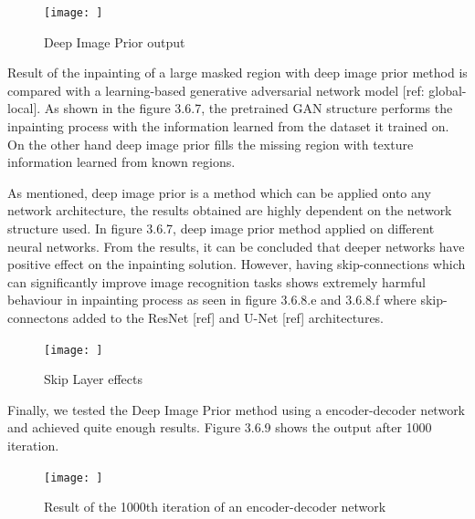 \begin{figure}[h]
    \centering
    \texttt{[image: ]}
    \caption{Deep Image Prior output}
    \label{fig:my_label}
\end{figure}

Result of the inpainting of a large masked region with deep image prior method is compared with a learning-based generative adversarial network model [ref: global-local]. As shown in the figure 3.6.7, the pretrained GAN structure performs the inpainting process with the information learned from the dataset it trained on. On the other hand deep image prior fills the missing region with texture information learned from known regions.

As mentioned, deep image prior is a method which can be applied onto any network architecture, the results obtained are highly dependent on the network structure used. In figure 3.6.7, deep image prior method applied on different neural networks. From the results, it can be concluded that deeper networks have positive effect on the inpainting solution. However, having skip-connections which can significantly improve image recognition tasks shows extremely harmful behaviour in inpainting process as seen in figure 3.6.8.e and 3.6.8.f where skip-connectons added to the ResNet [ref] and U-Net [ref] architectures.

\begin{figure}[h]
    \centering
    \texttt{[image: ]}
    \caption{Skip Layer effects}
    \label{fig:my_label}
\end{figure}

Finally, we tested the Deep Image Prior method using a encoder-decoder network and achieved quite enough results. Figure 3.6.9 shows the output after 1000 iteration.

\begin{figure}[h]
    \centering
    \texttt{[image: ]}
    \caption{Result of the 1000th iteration of an encoder-decoder network}
    \label{fig:my_label}
\end{figure}